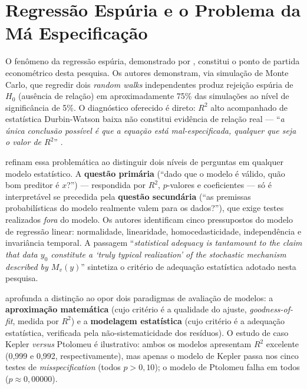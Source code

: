\documentclass[
    12pt,
    oneside,
    openany,
    a4paper,
    english,
    brazil
]{abntex2}
\theoremstyle{definition}
\begin{document}
\section{Regressão Espúria e o Problema da Má Especificação}
\label{sec:regressao-espuria}

O fenômeno da regressão espúria, demonstrado por , constitui o ponto de partida econométrico desta pesquisa. Os autores demonstram, via simulação de Monte Carlo, que regredir dois \textit{random walks} independentes produz rejeição espúria de $H_0$ (ausência de relação) em aproximadamente 75\% das simulações ao nível de significância de 5\%. O diagnóstico oferecido é direto: $R^2$ alto acompanhado de estatística Durbin-Watson baixa não constitui evidência de relação real --- ``\textit{a única conclusão possível é que a equação está mal-especificada, qualquer que seja o valor de $R^2$}'' \cite[p.~117]{granger1974spurious}.

 refinam essa problemática ao distinguir dois níveis de perguntas em qualquer modelo estatístico. A \textbf{questão primária} (``dado que o modelo é válido, quão bom preditor é $x$?'') --- respondida por $R^2$, $p$-valores e coeficientes --- só é interpretável se precedida pela \textbf{questão secundária} (``as premissas probabilísticas do modelo realmente valem para os dados?''), que exige testes realizados \textit{fora} do modelo. Os autores identificam cinco pressupostos do modelo de regressão linear: normalidade, linearidade, homocedasticidade, independência e invariância temporal. A passagem ``\textit{statistical adequacy is tantamount to the claim that data $y_0$ constitute a `truly typical realization' of the stochastic mechanism described by $M_v(y)$}'' \cite[p.~1020]{mayo2004methodology} sintetiza o critério de adequação estatística adotado nesta pesquisa.

 aprofunda a distinção ao opor dois paradigmas de avaliação de modelos: a \textbf{aproximação matemática} (cujo critério é a qualidade do ajuste, \textit{goodness-of-fit}, medida por $R^2$) e a \textbf{modelagem estatística} (cujo critério é a adequação estatística, verificada pela não-sistematicidade dos resíduos). O estudo de caso Kepler \textit{versus} Ptolomeu é ilustrativo: ambos os modelos apresentam $R^2$ excelente (0,999 e 0,992, respectivamente), mas apenas o modelo de Kepler passa nos cinco testes de \textit{misspecification} (todos $p > 0{,}10$); o modelo de Ptolomeu falha em todos ($p \approx 0{,}00000$).
\end{document}
